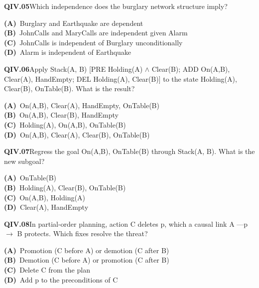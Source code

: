 \begin{tcolorbox}[enhanced,breakable,colback=white,colframe=navyL,arc=2mm,boxrule=0.7pt,left=3mm,right=3mm,top=2mm,bottom=2mm]
\textbf{\color{navy}QIV.05}\quad Which independence does the burglary network structure imply?\hfill{}\par\smallskip
{\small \textbf{\color{navyL}(A)}\ Burglary and Earthquake are dependent\\[1pt]\textbf{\color{navyL}(B)}\ JohnCalls and MaryCalls are independent given Alarm\\[1pt]\textbf{\color{navyL}(C)}\ JohnCalls is independent of Burglary unconditionally\\[1pt]\textbf{\color{navyL}(D)}\ Alarm is independent of Earthquake}
\end{tcolorbox}
\begin{tcolorbox}[enhanced,breakable,colback=white,colframe=navyL,arc=2mm,boxrule=0.7pt,left=3mm,right=3mm,top=2mm,bottom=2mm]
\textbf{\color{navy}QIV.06}\quad Apply Stack(A, B) [PRE Holding(A) $\wedge$ Clear(B); ADD On(A,B), Clear(A), HandEmpty; DEL Holding(A), Clear(B)] to the state {Holding(A), Clear(B), OnTable(B)}. What is the result?\hfill{}\par\smallskip
{\small \textbf{\color{navyL}(A)}\ {On(A,B), Clear(A), HandEmpty, OnTable(B)}\\[1pt]\textbf{\color{navyL}(B)}\ {On(A,B), Clear(B), HandEmpty}\\[1pt]\textbf{\color{navyL}(C)}\ {Holding(A), On(A,B), OnTable(B)}\\[1pt]\textbf{\color{navyL}(D)}\ {On(A,B), Clear(A), Clear(B), OnTable(B)}}
\end{tcolorbox}
\begin{tcolorbox}[enhanced,breakable,colback=white,colframe=navyL,arc=2mm,boxrule=0.7pt,left=3mm,right=3mm,top=2mm,bottom=2mm]
\textbf{\color{navy}QIV.07}\quad Regress the goal {On(A,B), OnTable(B)} through Stack(A, B). What is the new subgoal?\hfill{}\par\smallskip
{\small \textbf{\color{navyL}(A)}\ {OnTable(B)}\\[1pt]\textbf{\color{navyL}(B)}\ {Holding(A), Clear(B), OnTable(B)}\\[1pt]\textbf{\color{navyL}(C)}\ {On(A,B), Holding(A)}\\[1pt]\textbf{\color{navyL}(D)}\ {Clear(A), HandEmpty}}
\end{tcolorbox}
\begin{tcolorbox}[enhanced,breakable,colback=white,colframe=navyL,arc=2mm,boxrule=0.7pt,left=3mm,right=3mm,top=2mm,bottom=2mm]
\textbf{\color{navy}QIV.08}\quad In partial-order planning, action C deletes p, which a causal link A ---p$\to$ B protects. Which fixes resolve the threat?\hfill{}\par\smallskip
{\small \textbf{\color{navyL}(A)}\ Promotion (C before A) or demotion (C after B)\\[1pt]\textbf{\color{navyL}(B)}\ Demotion (C before A) or promotion (C after B)\\[1pt]\textbf{\color{navyL}(C)}\ Delete C from the plan\\[1pt]\textbf{\color{navyL}(D)}\ Add p to the preconditions of C}
\end{tcolorbox}
